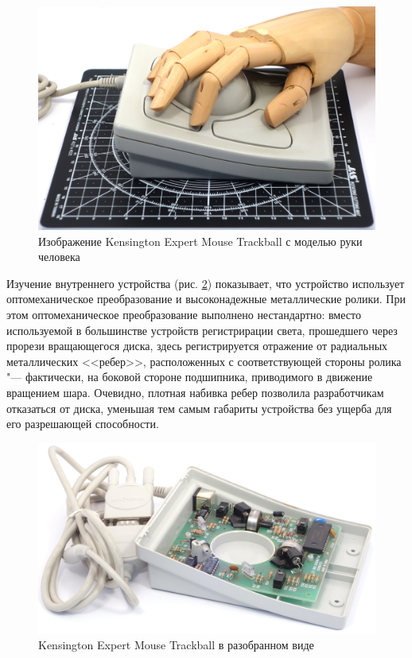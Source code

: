 \documentclass[11pt, a4paper]{article}
\begin{document}
\begin{figure}[h]
    \centering
    \includegraphics[scale=0.3]{1996_kensington_expert_trackball_5/hand_30.jpg}
    \caption{Изображение Kensington Expert Mouse Trackball с моделью руки человека}
    \label{fig:ExpertMouseHand}
\end{figure}

Изучение внутреннего устройства (рис. \ref{fig:ExpertMouseInside}) показывает, что устройство использует  оптомеханическое преобразование и высоконадежные металлические ролики. При этом оптомеханическое преобразование выполнено нестандартно: вместо используемой в большинстве устройств регистрирации света, прошедшего через прорези вращающегося диска, здесь регистрируется отражение от радиальных металлических <<ребер>>, расположенных с соответствующей стороны ролика "--- фактически, на боковой стороне подшипника, приводимого в движение вращением шара. Очевидно, плотная набивка ребер позволила разработчикам отказаться от диска, уменьшая тем самым габариты устройства без ущерба для его разрешающей способности.

\begin{figure}[h]
    \centering
    \includegraphics[scale=0.65]{1996_kensington_expert_trackball_5/inside_60.jpg}
    \caption{Kensington Expert Mouse Trackball в разобранном виде}
    \label{fig:ExpertMouseInside}
\end{figure}
\end{document}
